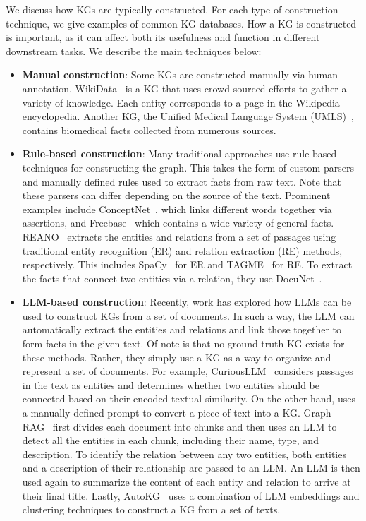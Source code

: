 We discuss how KGs are typically constructed. For each type of construction technique, we give examples of common KG databases. How a KG is constructed is important, as it can affect both its usefulness and function in different downstream tasks. We describe the main techniques below:
\begin{itemize}[leftmargin=*]
    \item {\bf Manual construction}: Some KGs are constructed manually via human annotation. WikiData~\cite{vrandevcic2014wikidata} is a KG that uses crowd-sourced efforts to gather a variety of knowledge. Each entity corresponds to a page in the Wikipedia encyclopedia. Another KG, the Unified Medical Language System (UMLS)~\cite{umls}, contains biomedical facts collected from numerous sources.

    \item {\bf Rule-based construction}: Many traditional approaches use rule-based techniques for constructing the graph. This takes the form of custom parsers and manually defined rules used to extract facts from raw text. Note that these parsers can differ depending on the source of the text. Prominent examples include ConceptNet~\cite{speer2017conceptnet}, which links different words together via assertions, and Freebase~\cite{bollacker2008freebase} which contains a wide variety of general facts. REANO~\cite{fang2024reano} extracts the entities and relations from a set of passages using traditional entity recognition (ER) and relation extraction (RE) methods, respectively. This includes SpaCy~\cite{honnibal2017spacy} for ER and TAGME~\cite{ferragina2010tagme} for RE. To extract the facts that connect two entities via a relation, they use DocuNet~\cite{zhang2021document}.

    \item {\bf LLM-based construction}: Recently, work has explored how LLMs can be used to construct KGs from a set of documents. In such a way, the LLM can automatically extract the entities and relations and link those together to form facts in the given text. Of note is that no ground-truth KG exists for these methods. Rather, they simply use a KG as a way to organize and represent a set of documents. For example, CuriousLLM~\cite{yang2024curiousllm} considers passages in the text as entities and determines whether two entities should be connected based on their encoded textual similarity. On the other hand, \citet{cheng2024structure} uses a manually-defined prompt to convert a piece of text into a KG. Graph-RAG~\cite{edge2024local} first divides each document into chunks and then uses an LLM to detect all the entities in each chunk, including their name, type, and description. To identify the relation between any two entities, both entities and a description of their relationship are passed to an LLM. An LLM is then used again to summarize the content of each entity and relation to arrive at their final title. Lastly, AutoKG~\cite{chen2023autokg} uses a combination of LLM embeddings and clustering techniques to construct a KG from a set of texts.
\end{itemize}




